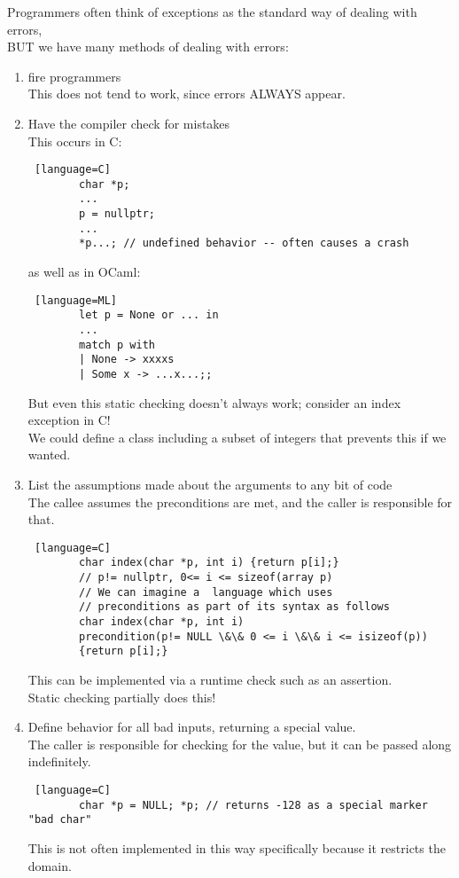 \documentclass[../../lecture_notes.tex]{subfiles}
\begin{document}
Programmers often think of exceptions as the standard way of dealing with errors,\\
\indent BUT we have many methods of dealing with errors:
\begin{enumerate}
	\item fire programmers\\
		This does not tend to work, since errors ALWAYS appear.
	\item Have the compiler check for mistakes\\
		This occurs in C: 
		\begin{lstlisting} [language=C]
		char *p;
		...
		p = nullptr;
		...
		*p...; // undefined behavior -- often causes a crash
		\end{lstlisting}
	        as well as in OCaml:
		\begin{lstlisting} [language=ML]
		let p = None or ... in
		...
		match p with
		| None -> xxxxs
		| Some x -> ...x...;;
		\end{lstlisting}
		But even this static checking doesn’t always work; consider an index exception in C!\\
		We could define a class including a subset of integers that prevents this if we wanted.
	\item List the assumptions made about the arguments to any bit of code\\
		The callee assumes the preconditions are met, and the caller is responsible for that.
		\begin{lstlisting} [language=C]
		char index(char *p, int i) {return p[i];}
		// p!= nullptr, 0<= i <= sizeof(array p)
		// We can imagine a  language which uses 
		// preconditions as part of its syntax as follows
		char index(char *p, int i)
		precondition(p!= NULL \&\& 0 <= i \&\& i <= isizeof(p))
		{return p[i];}
		\end{lstlisting}
		This can be implemented via a runtime check such as an assertion.\\
		Static checking partially does this!
	\item Define behavior for all bad inputs, returning a special value.\\
		The caller is responsible for checking for the value, but it can be passed along indefinitely.\\
		\begin{lstlisting} [language=C]
		char *p = NULL; *p; // returns -128 as a special marker "bad char"
		\end{lstlisting}
		This is not often implemented in this way specifically because it restricts the domain.

\end{enumerate}
\end{document}
